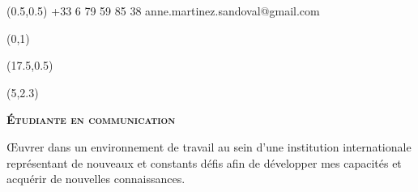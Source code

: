 \documentclass[30pt, french]{tccv}
\begin{document}
\begin{upshape}
\fontsize{9pt}{1em}\color{text}\selectfont



%
%




\begin{textblock}{6.5}(0.5,0.5)
    {+33 6 79 59 85 38}
    {anne.martinez.sandoval@gmail.com}
\end{textblock}

\begin{textblock}{21}(0,1)
\end{textblock}

\begin{textblock}{21}(17.5,0.5)
\end{textblock}  



\begin{textblock}{11}(5,2.3)

\begin{center}
\fontsize{10pt}{1.5em}\color{text}\bodyfontlight\upshape\selectfont

	{\fontsize{14pt}{5em}\scshape\bfseries \'Etudiante en communication\\} 

	\vspace{5pt}
Œuvrer dans un environnement de travail au sein d’une institution internationale représentant de nouveaux et constants défis afin de développer mes capacités et acquérir de nouvelles connaissances. 
\end{center}
\end{textblock}  





%
%


\end{upshape}
\end{document}
